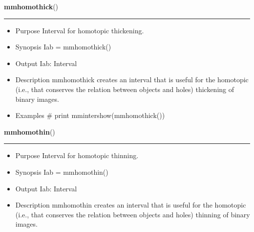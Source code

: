     \begin{boxedminipage}{\textwidth}

    \raggedright \textbf{mmhomothick}()

    \vspace{-1.5ex}

    \rule{\textwidth}{0.5\fboxrule}
    \begin{itemize}
    \setlength{\parskip}{0.6ex}
      \item Purpose Interval for homotopic thickening.

      \item Synopsis Iab = mmhomothick()

      \item Output Iab: Interval

      \item Description mmhomothick creates an interval that is useful for 
        the homotopic (i.e., that conserves the relation between objects 
        and holes) thickening of binary images.

      \item Examples \# print mmintershow(mmhomothick())

    \end{itemize}

    \vspace{1ex}

    \end{boxedminipage}

    \label{multireg:num_pymorph:mmhomothin}
    \vspace{0.5ex}

    \begin{boxedminipage}{\textwidth}

    \raggedright \textbf{mmhomothin}()

    \vspace{-1.5ex}

    \rule{\textwidth}{0.5\fboxrule}
    \begin{itemize}
    \setlength{\parskip}{0.6ex}
      \item Purpose Interval for homotopic thinning.

      \item Synopsis Iab = mmhomothin()

      \item Output Iab: Interval

      \item Description mmhomothin creates an interval that is useful for the 
        homotopic (i.e., that conserves the relation between objects and 
        holes) thinning of binary images.

    \end{itemize}

    \vspace{1ex}

    \end{boxedminipage}

